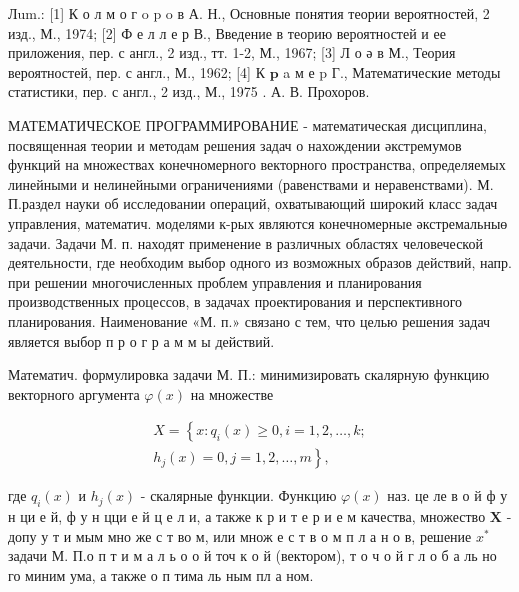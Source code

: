 \documentclass[10pt]{article}
\begin{document}
Лum.: [1] К о л м о г o p o в А. Н., Основные понятия теории вероятностей, 2 изд., М., 1974; [2] Ф е л л е р В., Введение в теорию вероятностей и ее приложения, пер. с англ., 2 изд., тт. 1-2, М., 1967; [3] Л о ә в М., Теория вероятностей, пер. с англ., М., 1962; [4] К $\mathbf{p}$ a м е p Г., Математические методы статистики, пер. с англ., 2 изд., М., 1975 . А. В. Прохоров.



МАТЕМАТИЧЕСКОЕ ПРОГРАММИРОВАНИЕ - математическая дисциплина, посвященная теории и методам решения задач о нахождении әкстремумов функций на множествах конечномерного векторного пространства, определяемых линейными и нелинейными ограничениями (равенствами и неравенствами). М. П.раздел науки об исследовании операций, охватывающий широкий класс задач управления, математич. моделями к-рых являются конечномерные әкстремальныө задачи. Задачи М. п. находят применение в различных областях человеческой деятельности, где необходим выбор одного из возможных образов действий, напр. при решении многочисленных проблем управления и планирования производственных процессов, в задачах проектирования и перспективного планирования. Наименование «М. п.» связано с тем, что целью решения задач является выбор п р о г р а м м ы действий.



Математич. формулировка задачи М. П.: минимизировать скалярную функцию векторного аргумента $\varphi(x)$ на множестве



\[

\begin{gathered}

X=\left\{x: q_{i}(x) \geqslant 0, i=1,2, \ldots, k ;\right. \\

\left.h_{j}(x)=0, j=1,2, \ldots, m\right\},

\end{gathered}

\]



где $q_{i}(x)$ и $h_{j}(x)$ - скалярные функции. Функцию $\varphi(x)$ наз. це ле в о й ф у н ци е й, ф у н цци е й ц е л и, а также к р и т е р и е м качества, множество $\boldsymbol{X}$ - допу у т и мым мно же с т во м, или множ е с т в о м п л а н о в, решение $x^{*}$ задачи М. П.о п т и м а л ь о о й точ к о й (вектором), т о ч о й г л о б а ль но го миним ума, а также о п тима ль ным пл а ном.
\end{document}
